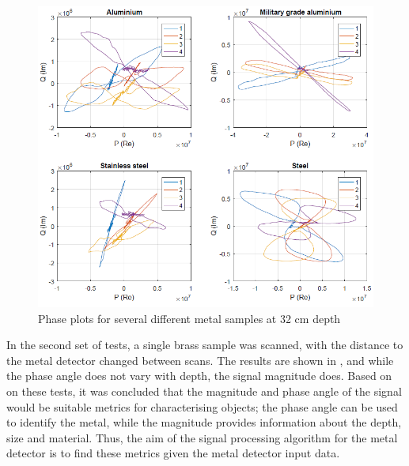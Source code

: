\documentclass[main.tex]{subfiles}
\begin{document}
\begin{figure}[htp]
\includegraphics[width=\textwidth]{3-ConceptDesign/metals.PNG}
\centering
\caption{Phase plots for several different metal samples at 32 cm depth} 
\end{figure}

In the second set of tests, a single brass sample was scanned, with the distance to the metal detector changed between scans. The results are shown in , and while the phase angle does not vary with depth, the signal magnitude does. Based on on these tests,   it was concluded that the magnitude and phase angle of the signal would be suitable metrics for characterising objects; the phase angle can be used to identify the metal, while the magnitude provides information about the depth, size and material. Thus, the aim of the signal processing algorithm for the metal detector is to find these metrics given the metal detector input data. 
\end{document}
